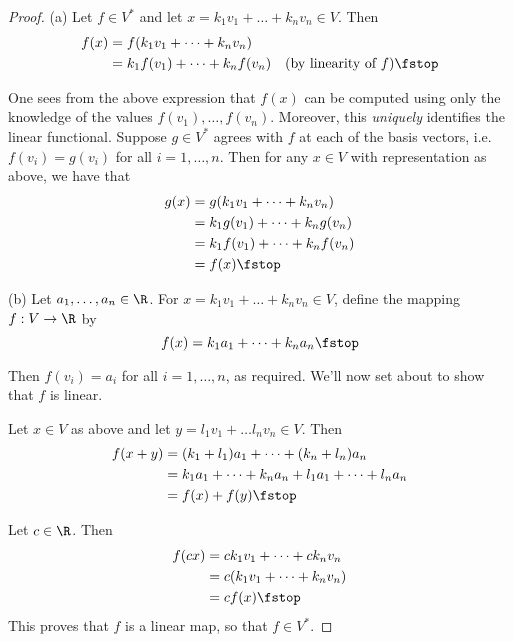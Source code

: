 \begin{proof}
  (a) Let \( f\in V^* \) and let \( x=k_1v_1+\dots+k_nv_n\in V \). Then
  \begin{align*}
    f(x)&= f(k_1v_1+\dots+k_nv_n)\\
    &= k_1f(v_1)+\dots+k_nf(v_n) &(\text{by linearity of }f)\fstop
  \end{align*}
  
  One sees from the above expression that \( f(x) \) can be computed using only the knowledge of the values \( f(v_1),\dots,f(v_n) \). Moreover, this \emph{uniquely} identifies the linear functional. Suppose \( g\in V^* \) agrees with \( f \) at each of the basis vectors, i.e.\ \( f(v_i)=g(v_i) \) for all \( i=1,\dots,n \). Then for any \( x\in V \) with representation as above, we have that
  \begin{align*}
    g(x)&= g(k_1v_1+\dots+k_nv_n)\\
    &= k_1g(v_1)+\dots+k_ng(v_n)\\
    &= k_1f(v_1)+\dots+k_nf(v_n)\\
    &= f(x)\fstop
  \end{align*}

  \vspace{3mm}

  (b) Let \( a_1,\dots, a_n\in\R \). For \( x=k_1v_1+\dots+k_nv_n\in V \), define the mapping \( f:V\to\R \) by
  \[ f(x)=k_1a_1+\dots+k_na_n\fstop \]
  
  Then \( f(v_i)=a_i \) for all \( i=1,\dots,n \), as required. We'll now set about to show that \( f \) is linear.

  \vspace{3mm}

  Let \( x\in V \) as above and let \( y=l_1v_1+\dots l_nv_n\in V \). Then
  \begin{align*}
    f(x+y)&= (k_1+l_1)a_1+\dots+(k_n+l_n)a_n\\
    &= k_1a_1+\dots+k_na_n+l_1a_1+\dots+l_na_n\\
    &= f(x)+f(y)\fstop
  \end{align*}

  Let \( c\in\R \). Then
  \begin{align*}
    f(cx)&= ck_1v_1+\dots+ck_nv_n\\
    &= c(k_1v_1+\dots+k_nv_n)\\
    &= cf(x)\fstop
  \end{align*}
  This proves that \( f \) is a linear map, so that \( f\in V^* \).
\end{proof}

